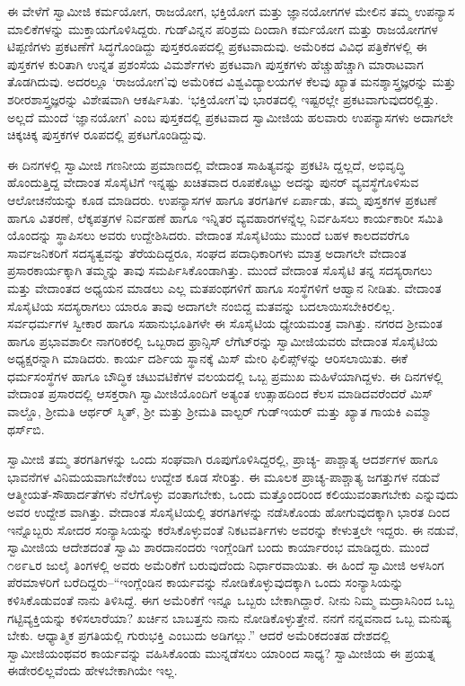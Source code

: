 ಈ ವೇಳೆಗೆ ಸ್ವಾಮೀಜಿ ಕರ್ಮಯೋಗ, ರಾಜಯೋಗ, ಭಕ್ತಿಯೋಗ ಮತ್ತು ಜ್ಞಾನಯೋಗಗಳ ಮೇಲಿನ ತಮ್ಮ ಉಪನ್ಯಾಸ ಮಾಲಿಕೆಗಳನ್ನು ಮುಕ್ತಾಯಗೊಳಿಸಿದ್ದರು. ಗುಡ್​ವಿನ್ನನ ಪರಿಶ್ರಮ ದಿಂದಾಗಿ ಕರ್ಮಯೋಗ ಮತ್ತು ರಾಜಯೋಗಗಳ ಟಿಪ್ಪಣಿಗಳು ಪ್ರಕಟಣೆಗೆ ಸಿದ್ಧಗೊಂಡಿದ್ದು ಪುಸ್ತಕರೂಪದಲ್ಲಿ ಪ್ರಕಟವಾದುವು. ಅಮೆರಿಕದ ವಿವಿಧ ಪತ್ರಿಕೆಗಳಲ್ಲಿ ಈ ಪುಸ್ತಕಗಳ ಕುರಿತಾಗಿ ಉನ್ನತ ಪ್ರಶಂಸೆಯ ವಿಮರ್ಶೆಗಳು ಪ್ರಕಟವಾಗಿ ಪುಸ್ತಕಗಳು ಹೆಚ್ಚುಹೆಚ್ಚಾಗಿ ಮಾರಾಟವಾಗ ತೊಡಗಿದುವು. ಅದರಲ್ಲೂ ‘ರಾಜಯೋಗ’ವು ಅಮೆರಿಕದ ವಿಶ್ವವಿದ್ಯಾಲಯಗಳ ಕೆಲವು ಖ್ಯಾತ ಮನಶ್ಶಾಸ್ತ್ರಜ್ಞರನ್ನು ಮತ್ತು ಶರೀರಶಾಸ್ತ್ರಜ್ಞರನ್ನು ವಿಶೇಷವಾಗಿ ಆಕರ್ಷಿಸಿತು. ‘ಭಕ್ತಿಯೋಗ’ವು ಭಾರತದಲ್ಲಿ ಇಷ್ಟರಲ್ಲೇ ಪ್ರಕಟವಾಗುವುದರಲ್ಲಿತ್ತು. ಅಲ್ಲದೆ ಮುಂದೆ ‘ಜ್ಞಾನಯೋಗ’ ಎಂಬ ಪುಸ್ತಕದಲ್ಲಿ ಪ್ರಕಟವಾದ ಸ್ವಾಮೀಜಿಯ ಹಲವಾರು ಉಪನ್ಯಾಸಗಳು ಅದಾಗಲೇ ಚಿಕ್ಕಚಿಕ್ಕ ಪುಸ್ತಕಗಳ ರೂಪದಲ್ಲಿ ಪ್ರಕಟಗೊಂಡಿದ್ದುವು.

ಈ ದಿನಗಳಲ್ಲಿ ಸ್ವಾಮೀಜಿ ಗಣನೀಯ ಪ್ರಮಾಣದಲ್ಲಿ ವೇದಾಂತ ಸಾಹಿತ್ಯವನ್ನು ಪ್ರಕಟಿಸಿ ದ್ದಲ್ಲದೆ, ಅಭಿವೃದ್ಧಿ ಹೊಂದುತ್ತಿದ್ದ ವೇದಾಂತ ಸೊಸೈಟಿಗೆ ಇನ್ನಷ್ಟು ಖಚಿತವಾದ ರೂಪಕೊಟ್ಟು ಅದನ್ನು ಪುನರ್ ವ್ಯವಸ್ಥೆಗೊಳಿಸುವ ಆಲೋಚನೆಯನ್ನು ಕೂಡ ಮಾಡಿದರು. ಉಪನ್ಯಾಸಗಳ ಹಾಗೂ ತರಗತಿಗಳ ಏರ್ಪಾಡು, ತಮ್ಮ ಪುಸ್ತಕಗಳ ಪ್ರಕಟಣೆ ಹಾಗೂ ವಿತರಣೆ, ಲೆಕ್ಕಪತ್ರಗಳ ನಿರ್ವಹಣೆ ಹಾಗೂ ಇನ್ನಿತರ ವ್ಯವಹಾರಗಳನ್ನೆಲ್ಲ ನಿರ್ವಹಿಸಲು ಕಾರ್ಯಕಾರೀ ಸಮಿತಿ ಯೊಂದನ್ನು ಸ್ಥಾಪಿಸಲು ಅವರು ಉದ್ದೇಶಿಸಿದರು. ವೇದಾಂತ ಸೊಸೈಟಿಯು ಮುಂದೆ ಬಹಳ ಕಾಲದವರೆಗೂ ಸಾರ್ವಜನಿಕರಿಗೆ ಸದಸ್ಯತ್ವವನ್ನು ತೆರೆಯದಿದ್ದರೂ, ಸಂಘದ ಪದಾಧಿಕಾರಿಗಳು ಮಾತ್ರ ಅದಾಗಲೇ ವೇದಾಂತ ಪ್ರಸಾರಕಾರ್ಯಕ್ಕಾಗಿ ತಮ್ಮನ್ನು ತಾವು ಸಮರ್ಪಿಸಿಕೊಂಡಾಗಿತ್ತು. ಮುಂದೆ ವೇದಾಂತ ಸೊಸೈಟಿ ತನ್ನ ಸದಸ್ಯರಾಗಲು ಮತ್ತು ವೇದಾಂತದ ಅಧ್ಯಯನ ಮಾಡಲು ಎಲ್ಲ ಮತಪಂಥಗಳಿಗೆ ಹಾಗೂ ಸಂಸ್ಥೆಗಳಿಗೆ ಆಹ್ವಾನ ನೀಡಿತು. ವೇದಾಂತ ಸೊಸೈಟಿಯ ಸದಸ್ಯರಾಗಲು ಯಾರೂ ತಾವು ಅದಾಗಲೇ ನಂಬಿದ್ದ ಮತವನ್ನು ಬದಲಾಯಿಸಬೇಕಿರಲಿಲ್ಲ. ಸರ್ವಧರ್ಮಗಳ ಸ್ವೀಕಾರ ಹಾಗೂ ಸಹಾನುಭೂತಿಗಳೇ ಈ ಸೊಸೈಟಿಯ ಧ್ಯೇಯಮಂತ್ರ ವಾಗಿತ್ತು. ನಗರದ ಶ್ರೀಮಂತ ಹಾಗೂ ಪ್ರಭಾವಶಾಲೀ ನಾಗರಿಕರಲ್ಲಿ ಒಬ್ಬರಾದ ಫ್ರಾನ್ಸಿಸ್ ಲೆಗೆಟ್​ರನ್ನು ಸ್ವಾಮೀಜಿಯವರು ವೇದಾಂತ ಸೊಸೈಟಿಯ ಅಧ್ಯಕ್ಷರನ್ನಾಗಿ ಮಾಡಿದರು. ಕಾರ್ಯ ದರ್ಶಿಯ ಸ್ಥಾನಕ್ಕೆ ಮಿಸ್ ಮೇರಿ ಫಿಲಿಪ್ಸ್​ಳನ್ನು ಆರಿಸಲಾಯಿತು. ಈಕೆ ಧರ್ಮಸಂಸ್ಥೆಗಳ ಹಾಗೂ ಬೌದ್ಧಿಕ ಚಟುವಟಿಕೆಗಳ ವಲಯದಲ್ಲಿ ಒಬ್ಬ ಪ್ರಮುಖ ಮಹಿಳೆಯಾಗಿದ್ದಳು. ಈ ದಿನಗಳಲ್ಲಿ ವೇದಾಂತ ಪ್ರಸಾರದಲ್ಲಿ ಆಸಕ್ತರಾಗಿ ಸ್ವಾಮೀಜಿಯೊಂದಿಗೆ ಅತ್ಯಂತ ಉತ್ಸಾಹದಿಂದ ಕೆಲಸ ಮಾಡಿದವರೆಂದರೆ ಮಿಸ್ ವಾಲ್ಡೊ, ಶ್ರೀಮತಿ ಆರ್ಥರ್ ಸ್ಮಿತ್, ಶ್ರೀ ಮತ್ತು ಶ್ರೀಮತಿ ವಾಲ್ಟರ್ ಗುಡ್​ಇಯರ್ ಮತ್ತು ಖ್ಯಾತ ಗಾಯಕಿ ಎಮ್ಮಾ ಥರ್ಸ್​ಬಿ.

ಸ್ವಾಮೀಜಿ ತಮ್ಮ ತರಗತಿಗಳನ್ನು ಒಂದು ಸಂಘವಾಗಿ ರೂಪುಗೊಳಿಸಿದ್ದರಲ್ಲಿ, ಪ್ರಾಚ್ಯ- ಪಾಶ್ಚಾತ್ಯ ಆದರ್ಶಗಳ ಹಾಗೂ ಭಾವನೆಗಳ ವಿನಿಮಯವಾಗಬೇಕೆಂಬ ಉದ್ದೇಶ ಕೂಡ ಸೇರಿತ್ತು. ಈ ಮೂಲಕ ಪ್ರಾಚ್ಯ-ಪಾಶ್ಚಾತ್ಯ ಜಗತ್ತುಗಳ ನಡುವೆ ಆತ್ಮೀಯತೆ-ಸೌಹಾರ್ದತೆಗಳು ನೆಲೆಗೊಳ್ಳು ವಂತಾಗಬೇಕು, ಒಂದು ಮತ್ತೊಂದರಿಂದ ಕಲಿಯುವಂತಾಗಬೇಕು ಎನ್ನುವುದು ಅವರ ಉದ್ದೇಶ ವಾಗಿತ್ತು. ವೇದಾಂತ ಸೊಸೈಟಿಯಲ್ಲಿ ತರಗತಿಗಳನ್ನು ನಡೆಸಿಕೊಂಡು ಹೋಗುವುದಕ್ಕಾಗಿ ಭಾರತ ದಿಂದ ಇನ್ನೊಬ್ಬರು ಸೋದರ ಸಂನ್ಯಾಸಿಯನ್ನು ಕರೆಸಿಕೊಳ್ಳುವಂತೆ ನಿಕಟವರ್ತಿಗಳು ಅವರನ್ನು ಕೇಳುತ್ತಲೇ ಇದ್ದರು. ಈ ನಡುವೆ, ಸ್ವಾಮೀಜಿಯ ಆದೇಶದಂತೆ ಸ್ವಾಮಿ ಶಾರದಾನಂದರು ಇಂಗ್ಲೆಂಡಿಗೆ ಬಂದು ಕಾರ್ಯಾರಂಭ ಮಾಡಿದ್ದರು. ಮುಂದೆ ೧೮೯೬ರ ಜುಲೈ ತಿಂಗಳಲ್ಲಿ ಅವರು ಅಮೆರಿಕೆಗೆ ಬರುವುದೆಂದು ನಿರ್ಧಾರವಾಯಿತು. ಈ ಹಿಂದೆ ಸ್ವಾಮೀಜಿ ಅಳಸಿಂಗ ಪೆರಮಾಳರಿಗೆ ಬರೆದಿದ್ದರು–“ಇಂಗ್ಲೆಂಡಿನ ಕಾರ್ಯವನ್ನು ನೋಡಿಕೊಳ್ಳುವುದಕ್ಕಾಗಿ ಒಂದು ಸಂನ್ಯಾಸಿಯನ್ನು ಕಳಿಸಿಕೊಡುವಂತೆ ನಾನು ತಿಳಿಸಿದ್ದೆ. ಈಗ ಅಮೆರಿಕೆಗೆ ಇನ್ನೂ ಒಬ್ಬರು ಬೇಕಾಗಿದ್ದಾರೆ. ನೀನು ನಿಮ್ಮ ಮದ್ರಾಸಿನಿಂದ ಒಬ್ಬ ಗಟ್ಟಿವ್ಯಕ್ತಿಯನ್ನು ಕಳಿಸಲಾರೆಯಾ? ಖರ್ಚಿನ ಬಾಬತ್ತನು ನಾನು ನೋಡಿಕೊಳ್ಳುತ್ತೇನೆ. ನನಗೆ ನನ್ನವನಾದ ಒಬ್ಬ ಮನುಷ್ಯ ಬೇಕು. ಆಧ್ಯಾತ್ಮಿಕ ಪ್ರಗತಿಯಲ್ಲಿ ಗುರುಭಕ್ತಿ ಎಂಬುದು ಅಡಿಗಲ್ಲು.” ಆದರೆ ಅಮೆರಿಕದಂತಹ ದೇಶದಲ್ಲಿ ಸ್ವಾಮೀಜಿಯಂಥವರ ಕಾರ್ಯವನ್ನು ವಹಿಸಿಕೊಂಡು ಮುನ್ನಡೆಸಲು ಯಾರಿಂದ ಸಾಧ್ಯ? ಸ್ವಾಮೀಜಿಯ ಈ ಪ್ರಯತ್ನ ಈಡೇರಲಿಲ್ಲವೆಂದು ಹೇಳಬೇಕಾಗಿಯೇ ಇಲ್ಲ.

